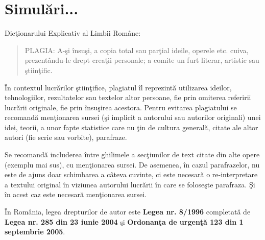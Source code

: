 \chapter{Simulări...}
\label{chap:div}


 Dicţionarului Explicativ al Limbii Române:

\blockquote{PLAGIA: A-şi însuşi, a copia total sau parţial ideile, operele etc. cuiva, prezentându-le drept creaţii personale; a comite un furt literar, artistic sau ştiinţific.}

	În contextul lucrărilor ştiinţifice, plagiatul îl reprezintă utilizarea ideilor, tehnologiilor, rezultatelor sau textelor altor persoane, fie prin omiterea referirii lucrării originale, fie prin însuşirea acestora. Pentru evitarea plagiatului se recomandă menţionarea sursei (şi implicit a autorului sau autorilor originali) unei idei, teorii, a unor fapte statistice care nu ţin de cultura generală, citate ale altor autori (fie scrie sau vorbite), parafraze.

	Se recomandă includerea între ghilimele a secţiunilor de text citate din alte opere (exemplu mai sus), cu menţionarea sursei. De asemenea, în cazul parafrazelor, nu este de ajuns doar schimbarea a câteva cuvinte, ci este necesară o re-interpretare a textului original în viziunea autorului lucrării în care se foloseşte parafraza. Şi în acest caz este necesară menţionarea sursei.

	În România, legea drepturilor de autor este \textbf{Legea nr. 8/1996} completată de \textbf{Legea nr. 285 din 23 iunie 2004} şi \textbf{Ordonanţa de urgenţă 123 din 1 septembrie 2005}.

